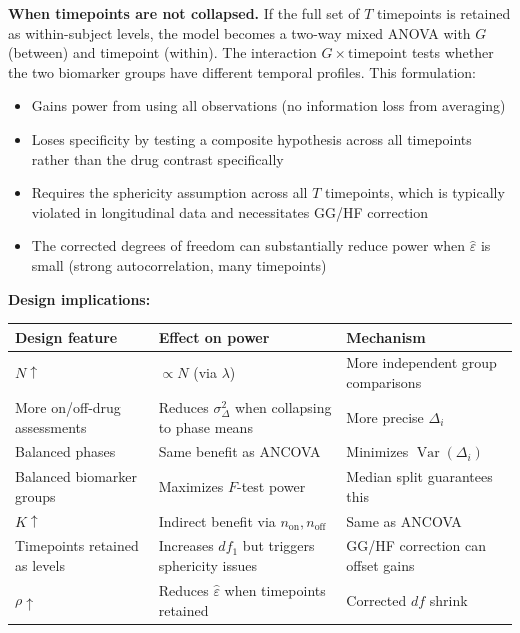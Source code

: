 \documentclass[11pt]{article}
\begin{document}
\textbf{When timepoints are not collapsed.} If the full set of $T$
timepoints is retained as within-subject levels, the model becomes a
two-way mixed ANOVA with $G$ (between) and timepoint (within). The
interaction $G \times \text{timepoint}$ tests whether the two biomarker
groups have different temporal profiles. This formulation:
\begin{itemize}[nosep]
\item Gains power from using all observations (no information loss from
  averaging)
\item Loses specificity by testing a composite hypothesis across all
  timepoints rather than the drug contrast specifically
\item Requires the sphericity assumption across all $T$ timepoints,
  which is typically violated in longitudinal data and necessitates
  GG/HF correction
\item The corrected degrees of freedom can substantially reduce power
  when $\hat{\varepsilon}$ is small (strong autocorrelation, many
  timepoints)
\end{itemize}

\textbf{Design implications:}

\begin{table}[h]
\centering\small
\begin{tabular}{@{}L{4cm}L{4.5cm}L{5cm}@{}}
\toprule
Design feature & Effect on power & Mechanism \\
\midrule
$N \uparrow$ & $\propto N$ (via $\lambda$) & More independent group comparisons \\
More on/off-drug assessments & Reduces $\sigma^2_\Delta$ when collapsing to phase means & More precise $\Delta_i$ \\
Balanced phases & Same benefit as ANCOVA & Minimizes $\operatorname{Var}(\Delta_i)$ \\
Balanced biomarker groups & Maximizes $F$-test power & Median split guarantees this \\
$K \uparrow$ & Indirect benefit via $n_{\text{on}}, n_{\text{off}}$ & Same as ANCOVA \\
Timepoints retained as levels & Increases $df_1$ but triggers sphericity issues & GG/HF correction can offset gains \\
$\rho \uparrow$ & Reduces $\hat{\varepsilon}$ when timepoints retained & Corrected $df$ shrink \\
\bottomrule
\end{tabular}
\end{table}
\end{document}
